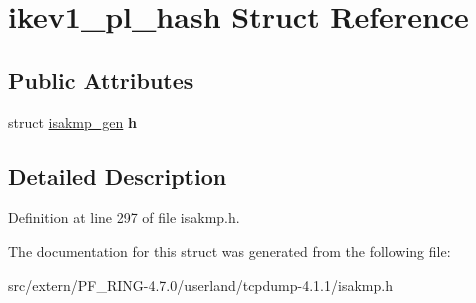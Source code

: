 \hypertarget{structikev1__pl__hash}{
\section{ikev1\_\-pl\_\-hash Struct Reference}
\label{structikev1__pl__hash}
}
\subsection*{Public Attributes}
\begin{DoxyCompactItemize}
\item 
\hypertarget{structikev1__pl__hash_ae7289e907daccf3a3d88a15853c7d9e7}{
struct \hyperlink{structisakmp__gen}{isakmp\_\-gen} {\bfseries h}}
\label{structikev1__pl__hash_ae7289e907daccf3a3d88a15853c7d9e7}

\end{DoxyCompactItemize}


\subsection{Detailed Description}


Definition at line 297 of file isakmp.h.



The documentation for this struct was generated from the following file:\begin{DoxyCompactItemize}
\item 
src/extern/PF\_\-RING-\/4.7.0/userland/tcpdump-\/4.1.1/isakmp.h\end{DoxyCompactItemize}
